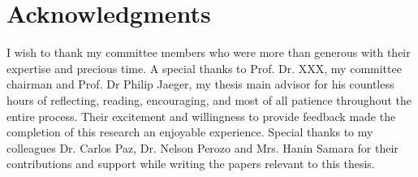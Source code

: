 \chapter*{Acknowledgments}

I wish to thank my committee members who were more than generous with their expertise and precious time. A special thanks to Prof. Dr. XXX, my committee chairman and Prof. Dr Philip Jaeger, my thesis main advisor for his countless hours of reflecting, reading, encouraging, and most of all patience throughout the entire process. Their excitement and willingness to provide feedback made the completion of this research an enjoyable experience. Special thanks to my colleagues Dr. Carlos Paz, Dr. Nelson Perozo and Mrs. Hanin Samara for their contributions and support while writing the papers relevant to this thesis.